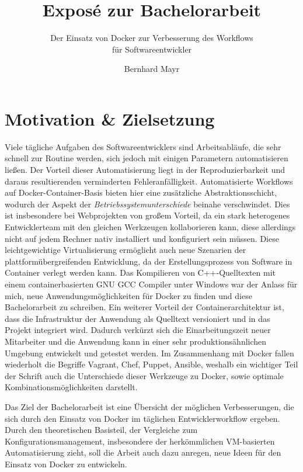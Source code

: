 \documentclass[a4paper, parindent, ngerman]{scrreprt}
\begin{document}
\title{Exposé zur Bachelorarbeit}
\subtitle{Der Einsatz von Docker zur Verbesserung des Workflows\\für Softwareentwickler}
\author{Bernhard Mayr}
\maketitle


\chapter{Motivation \& Zielsetzung}
Viele tägliche Aufgaben des Softwareentwicklers sind Arbeitsabläufe, die sehr schnell zur Routine werden, sich jedoch mit einigen Parametern automatisieren ließen. Der Vorteil dieser Automatisierung liegt in der Reproduzierbarkeit und daraus resultierenden verminderten Fehleranfälligkeit.
Automatisierte Workflows auf Docker-Container-Basis bieten hier eine zusätzliche Abstraktionsschicht, wodurch der Aspekt der  \emph{Betriebssystemunterschiede} beinahe verschwindet. Dies ist insbesondere bei Webprojekten von großem Vorteil, da ein stark heterogenes Entwicklerteam mit den gleichen Werkzeugen kollaborieren kann, diese allerdings nicht auf jedem Rechner nativ installiert und konfiguriert sein müssen.
Diese leichtgewichtige Virtualisierung ermöglicht auch neue Szenarien der plattformübergreifenden Entwicklung, da der Erstellungsprozess von Software in Container verlegt werden kann. Das Kompilieren von C++-Quelltexten mit einem containerbasierten GNU GCC Compiler unter Windows war der Anlass für mich, neue Anwendungsmöglichkeiten für Docker zu finden und diese Bachelorarbeit zu schreiben.
Ein weiterer Vorteil der Containerarchitektur ist, dass die Infrastruktur der Anwendung als Quelltext versioniert und in das Projekt integriert wird. Dadurch verkürzt sich die Einarbeitungszeit neuer Mitarbeiter und die Anwendung kann in einer sehr produktionsähnlichen Umgebung entwickelt und getestet werden.
Im Zusammenhang mit Docker fallen wiederholt die Begriffe Vagrant, Chef, Puppet, Ansible, weshalb ein wichtiger Teil der Schrift auch die Unterschiede dieser Werkzeuge zu Docker, sowie optimale Kombinationsmöglichkeiten darstellt.

Das Ziel der Bachelorarbeit ist eine Übersicht der möglichen Verbesserungen, die sich durch den Einsatz von Docker im täglichen Entwicklerworkflow ergeben. Durch den theoretischen Basisteil, der Vergleiche zum Konfigurationsmanagement, insbesondere der herkömmlichen VM-basierten Automatisierung zieht, soll die Arbeit auch dazu anregen, neue Ideen für den Einsatz von Docker zu entwickeln.
\end{document}
